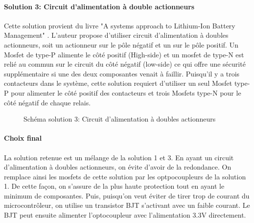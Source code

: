 		\paragraph*{Solution 3: Circuit d'alimentation à double actionneurs}
		\paragraph*{}
		Cette solution provient du livre "A systems approach to Lithium-Ion Battery Management" \cite{System_Approach}. L'auteur propose d'utiliser circuit d'alimentation à doubles actionneurs, soit un actionneur sur le pôle négatif et un sur le pôle positif. Un Mosfet de type-P alimente le côté positif (High-side) et un mosfet de type-N est relié au commun sur le circuit du côté négatif (low-side) ce qui offre une sécurité supplémentaire si une des deux composantes venait à faillir. Puisqu'il y a trois contacteurs dans le système, cette solution requiert d'utiliser un seul Mosfet type-P pour alimenter le côté positif des contacteurs et trois Mosfets type-N pour le côté négatif de chaque relais.

		\begin{figure}[H]
			\centering
			\caption{Schéma solution 3: Circuit d'alimentation à doubles actionneurs}
			\label{fig:contactorsol3}
		\end{figure}
		
		\paragraph*{Choix final}
		\paragraph*{}
		La solution retenue est un mélange de la solution 1 et 3. En ayant un circuit d'alimentation à doubles actionneurs, on évite d'avoir de la redondance. On remplace ainsi les mosfets de cette solution par les optpocoupleurs de la solution 1. De cette façon, on s'assure de la plus haute protection tout en ayant le minimum de composantes. Puis, puisqu'on veut éviter de tirer trop de courant du microcontrôleur, on utilise un transistor BJT s'activant avec un faible courant. Le BJT peut ensuite alimenter l'optocoupleur avec l'alimentation 3.3V directement.

